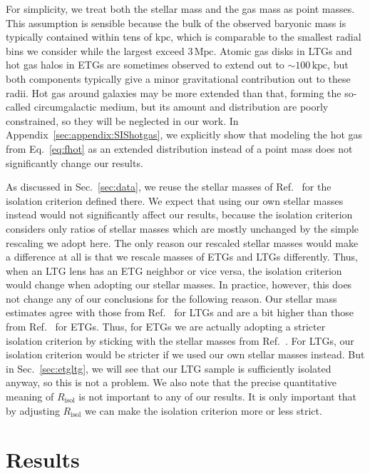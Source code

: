 \documentclass[a4paper,11pt]{article}
\begin{document}
For simplicity, we treat both the stellar mass and the gas mass as point masses.
This assumption is sensible because the bulk of the observed baryonic mass is typically contained within tens of $\mathrm{kpc}$, which is comparable to the smallest radial bins we consider while the largest exceed $3\,\mathrm{Mpc}$.
Atomic gas disks in LTGs and hot gas halos in ETGs are sometimes observed to extend out to $\sim 100\,\mathrm{kpc}$, but both components typically give a minor gravitational contribution out to these radii.
Hot gas around galaxies may be more extended than that, forming  the so-called circumgalactic medium, but its amount and distribution are poorly constrained, so they will be neglected in our work.
In Appendix~\ref{sec:appendix:SIShotgas}, we explicitly show that modeling the hot gas from Eq.~\eqref{eq:fhot} as an extended distribution instead of a point mass does not significantly change our results.

As discussed in Sec.~\ref{sec:data}, we reuse the stellar masses of Ref.~\cite{Brouwer2021} for the isolation criterion defined there.
We expect that using our own stellar masses instead would not significantly affect our results, because the isolation criterion considers only ratios of stellar masses which are mostly unchanged by the simple rescaling we adopt here.
The only reason our rescaled stellar masses would make a difference at all is that we rescale masses of ETGs and LTGs differently.
Thus, when an LTG lens has an ETG neighbor or vice versa, the isolation criterion would change when adopting our stellar masses.
In practice, however, this does not change any of our conclusions for the following reason.
Our stellar mass estimates agree with those from Ref.~\cite{Brouwer2021} for LTGs and are a bit higher than those from Ref.~\cite{Brouwer2021} for ETGs.
Thus, for ETGs we are actually adopting a stricter isolation criterion by sticking with the stellar masses from Ref.~\cite{Brouwer2021}.
For LTGs, our isolation criterion would be stricter if we used our own stellar masses instead.
But in Sec.~\ref{sec:etgltg}, we will see that our LTG sample is sufficiently isolated anyway, so this is not a problem.
We also note that the precise quantitative meaning of $R_{\mathrm{isol}}$ is not important to any of our results.
It is only important that by adjusting $R_{\mathrm{isol}}$ we can make the isolation criterion more or less strict.

\section{Results}
\label{sec:results}
\end{document}
